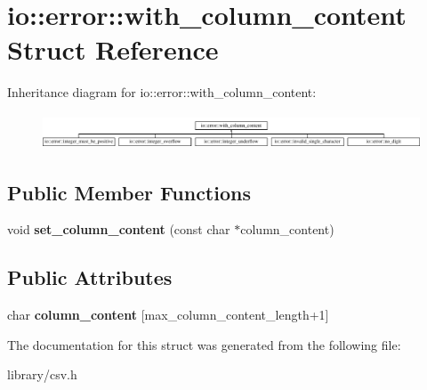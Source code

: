 \hypertarget{structio_1_1error_1_1with__column__content}{}\section{io\+:\+:error\+:\+:with\+\_\+column\+\_\+content Struct Reference}
\label{structio_1_1error_1_1with__column__content}
Inheritance diagram for io\+:\+:error\+:\+:with\+\_\+column\+\_\+content\+:\begin{figure}[H]
\begin{center}
\leavevmode
\includegraphics[height=1.051643cm]{structio_1_1error_1_1with__column__content}
\end{center}
\end{figure}
\subsection*{Public Member Functions}
\begin{DoxyCompactItemize}
\item 
\mbox{\label{structio_1_1error_1_1with__column__content_ae7375310dc02425cb3cc4115b3ac8d6a}} 
void {\bfseries set\+\_\+column\+\_\+content} (const char $\ast$column\+\_\+content)
\end{DoxyCompactItemize}
\subsection*{Public Attributes}
\begin{DoxyCompactItemize}
\item 
\mbox{\label{structio_1_1error_1_1with__column__content_a8587779769fbfb40155abb362137a523}} 
char {\bfseries column\+\_\+content} \mbox{[}max\+\_\+column\+\_\+content\+\_\+length+1\mbox{]}
\end{DoxyCompactItemize}


The documentation for this struct was generated from the following file\+:\begin{DoxyCompactItemize}
\item 
library/csv.\+h\end{DoxyCompactItemize}
